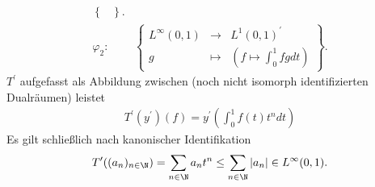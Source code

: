 \begin{solution}
\begin{align*}
\begin{Bmatrix}
  \end{Bmatrix}. \\
  \varphi_2:& \begin{Bmatrix}
    L^\infty(0, 1) & \to & L^1(0, 1)^{\prime} \\
    g &\mapsto & (f \mapsto \int_0^1 fg dt)
  \end{Bmatrix}.
\end{align*}
$T^{\prime}$ aufgefasst als Abbildung zwischen (noch nicht isomorph identifizierten
Dualräumen) leistet
\begin{align*}
  T^{\prime}(y^{\prime})(f) = y^{\prime}(\int_0^1 f(t)t^n dt)
\end{align*}
Es gilt schließlich nach kanonischer Identifikation
\begin{align*}
  T^{\prime}((a_n)_{n \in\N}) = \sum_{n \in \N}a_n t^n \leq \sum_{n \in \N}|a_n| \in L^\infty(0, 1).
\end{align*}
\end{solution}

